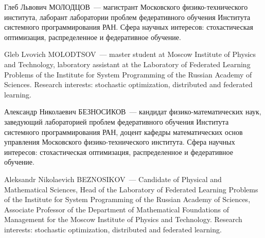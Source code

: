 \documentclass{ProcISPRAS}
\begin{document}
Глеб Львович МОЛОДЦОВ~--- магистрант Московского физико-технического института, лаборант лаборатории проблем федеративного обучения Института системного программирования РАН. Сфера научных интересов: стохастическая оптимизация, распределенное и федеративное обучение.

Gleb Lvovich MOLODTSOV~--- master student at Moscow Institute of Physics and Technology, laboratory assistant at the Laboratory of Federated Learning Problems of the Institute for System Programming of the Russian Academy of Sciences. Research interests: stochastic optimization, distributed and federated learning.

Александр Николаевич БЕЗНОСИКОВ~--- кандидат физико-математических наук,  заведующий лабораторией проблем федеративного обучения Института системного программирования РАН, доцент кафедры математических основ управления Московского физико-технического института. Сфера научных интересов: стохастическая оптимизация, распределенное и федеративное обучение.

Aleksandr Nikolaevich BEZNOSIKOV~--- Candidate of Physical and Mathematical Sciences, Head of the Laboratory of Federated Learning Problems of the Institute for System Programming of the Russian Academy of Sciences, Associate Professor of the Department of Mathematical Foundations of Management for the Moscow Institute of Physics and Technology. Research interests: stochastic optimization, distributed and federated learning.

\end{document}
